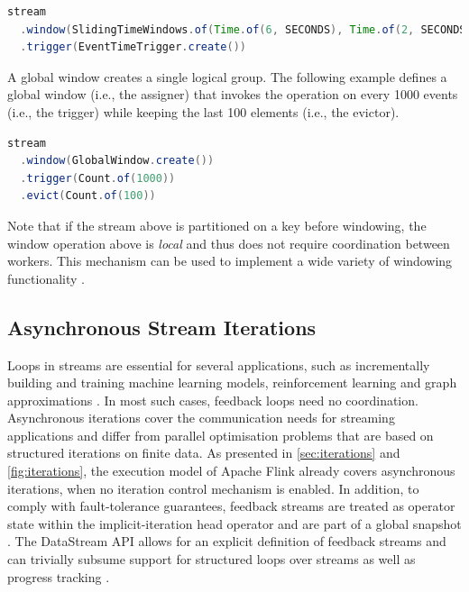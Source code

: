 \documentclass[11pt]{article}
\begin{document}
\begin{lstlisting}[language=Java]
stream
  .window(SlidingTimeWindows.of(Time.of(6, SECONDS), Time.of(2, SECONDS))
  .trigger(EventTimeTrigger.create())
\end{lstlisting}

\noindent A global window creates a single logical group. The following example defines a global window (i.e., the assigner) that invokes the operation on every 1000 events (i.e., the trigger) while keeping the last 100 elements (i.e., the evictor). 

\begin{lstlisting}[language=Java]
stream
  .window(GlobalWindow.create())
  .trigger(Count.of(1000))
  .evict(Count.of(100))
\end{lstlisting}

Note that if the stream above is partitioned on a key before  windowing, the window operation above is \textit{local} and thus does not require coordination between workers. This mechanism can be used to implement a wide variety of windowing functionality \cite{akidau2015dataflow}. 

\vspace{-3mm}
\subsection{Asynchronous Stream Iterations}
\label{sec:stream-iterations}
\vspace{-2mm}
Loops in streams are essential for several applications, such as incrementally building and training machine learning models, reinforcement learning and graph approximations \cite{feigenbaum2005graph,chandramouli2009fly}.
In most such cases, feedback loops need no coordination. Asynchronous iterations cover the communication needs for streaming applications and differ from parallel optimisation problems that are based on structured iterations on finite data. As presented in \autoref{sec:iterations} and \autoref{fig:iterations}, the execution model of Apache Flink already covers asynchronous iterations, when no iteration control mechanism is enabled. In addition, to comply with fault-tolerance guarantees, feedback streams are treated as operator state within the implicit-iteration head operator and are part of a global snapshot \cite{carbone2015lightweight}. The DataStream API allows for an explicit definition of feedback streams and can trivially subsume support for structured loops over streams \cite{murray2013naiad} as well as progress tracking \cite{chandramouli2009fly}.
\end{document}
